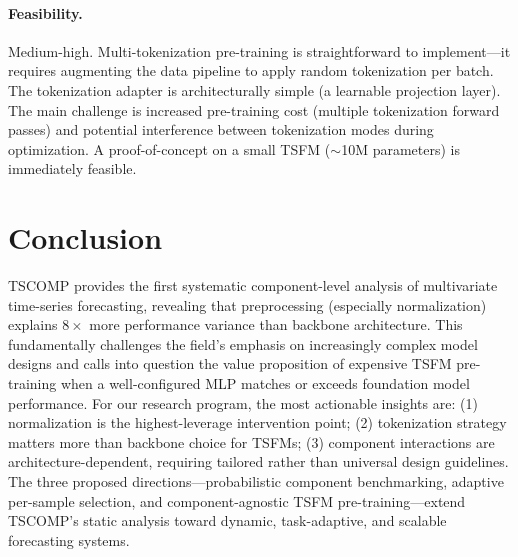 \documentclass[11pt,a4paper]{article}
\begin{document}
\paragraph{Feasibility.} Medium-high. Multi-tokenization pre-training is straightforward to implement---it requires augmenting the data pipeline to apply random tokenization per batch. The tokenization adapter is architecturally simple (a learnable projection layer). The main challenge is increased pre-training cost (multiple tokenization forward passes) and potential interference between tokenization modes during optimization. A proof-of-concept on a small TSFM ($\sim$10M parameters) is immediately feasible.

\section{Conclusion}

TSCOMP provides the first systematic component-level analysis of multivariate time-series forecasting, revealing that preprocessing (especially normalization) explains $8\times$ more performance variance than backbone architecture. This fundamentally challenges the field's emphasis on increasingly complex model designs and calls into question the value proposition of expensive TSFM pre-training when a well-configured MLP matches or exceeds foundation model performance. For our research program, the most actionable insights are: (1) normalization is the highest-leverage intervention point; (2) tokenization strategy matters more than backbone choice for TSFMs; (3) component interactions are architecture-dependent, requiring tailored rather than universal design guidelines. The three proposed directions---probabilistic component benchmarking, adaptive per-sample selection, and component-agnostic TSFM pre-training---extend TSCOMP's static analysis toward dynamic, task-adaptive, and scalable forecasting systems.
\end{document}
